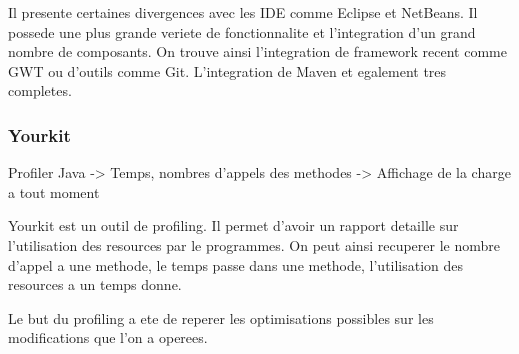 Il presente certaines divergences avec les IDE comme Eclipse et NetBeans. Il possede une plus grande veriete de fonctionnalite et l'integration d'un grand nombre de composants. On trouve ainsi l'integration de framework recent comme GWT ou d'outils comme Git. L'integration de Maven et egalement tres completes. 
\subsubsection{Yourkit}
Profiler Java
-> Temps, nombres d'appels des methodes
-> Affichage de la charge a tout moment

Yourkit est un outil de profiling. Il permet d'avoir un rapport detaille sur l'utilisation des resources par le programmes. On peut ainsi recuperer le nombre d'appel a une methode, le temps passe dans une methode, l'utilisation des resources a un temps donne.

Le but du profiling a ete de reperer les optimisations possibles sur les modifications que l'on a operees.